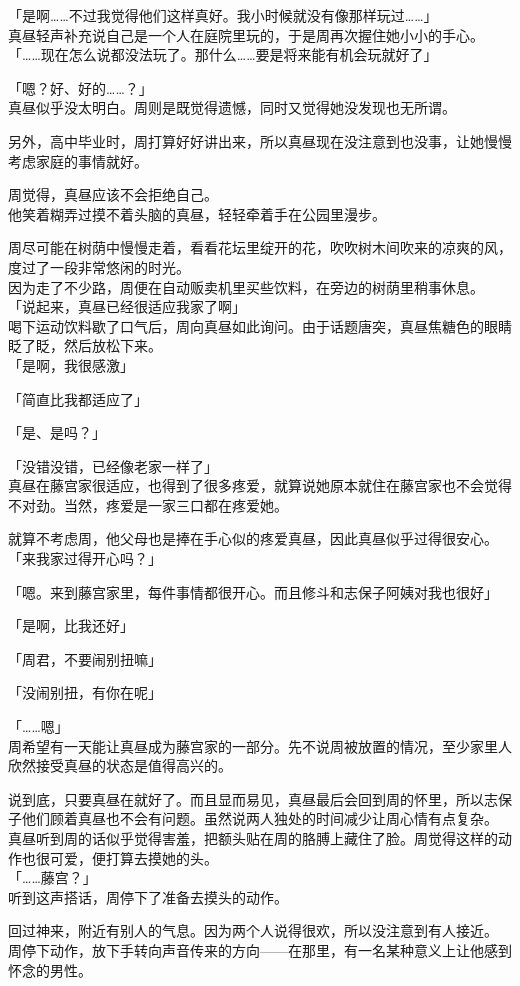 「是啊……不过我觉得他们这样真好。我小时候就没有像那样玩过……」\\

真昼轻声补充说自己是一个人在庭院里玩的，于是周再次握住她小小的手心。\\

「……现在怎么说都没法玩了。那什么……要是将来能有机会玩就好了」

「嗯？好、好的……？」\\

真昼似乎没太明白。周则是既觉得遗憾，同时又觉得她没发现也无所谓。

另外，高中毕业时，周打算好好讲出来，所以真昼现在没注意到也没事，让她慢慢考虑家庭的事情就好。

周觉得，真昼应该不会拒绝自己。\\

他笑着糊弄过摸不着头脑的真昼，轻轻牵着手在公园里漫步。

周尽可能在树荫中慢慢走着，看看花坛里绽开的花，吹吹树木间吹来的凉爽的风，度过了一段非常悠闲的时光。\\

因为走了不少路，周便在自动贩卖机里买些饮料，在旁边的树荫里稍事休息。\\

「说起来，真昼已经很适应我家了啊」\\

喝下运动饮料歇了口气后，周向真昼如此询问。由于话题唐突，真昼焦糖色的眼睛眨了眨，然后放松下来。\\

「是啊，我很感激」

「简直比我都适应了」

「是、是吗？」

「没错没错，已经像老家一样了」\\

真昼在藤宫家很适应，也得到了很多疼爱，就算说她原本就住在藤宫家也不会觉得不对劲。当然，疼爱是一家三口都在疼爱她。

就算不考虑周，他父母也是捧在手心似的疼爱真昼，因此真昼似乎过得很安心。\\

「来我家过得开心吗？」

「嗯。来到藤宫家里，每件事情都很开心。而且修斗和志保子阿姨对我也很好」

「是啊，比我还好」

「周君，不要闹别扭嘛」

「没闹别扭，有你在呢」

「……嗯」\\

周希望有一天能让真昼成为藤宫家的一部分。先不说周被放置的情况，至少家里人欣然接受真昼的状态是值得高兴的。

说到底，只要真昼在就好了。而且显而易见，真昼最后会回到周的怀里，所以志保子他们顾着真昼也不会有问题。虽然说两人独处的时间减少让周心情有点复杂。\\

真昼听到周的话似乎觉得害羞，把额头贴在周的胳膊上藏住了脸。周觉得这样的动作也很可爱，便打算去摸她的头。\\

「……藤宫？」\\

听到这声搭话，周停下了准备去摸头的动作。

回过神来，附近有别人的气息。因为两个人说得很欢，所以没注意到有人接近。\\

周停下动作，放下手转向声音传来的方向——在那里，有一名某种意义上让他感到怀念的男性。
